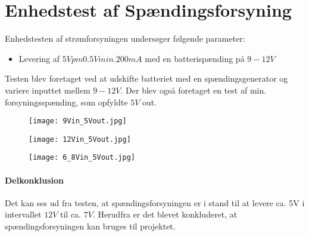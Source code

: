 %
%

\chapter{Enhedstest af Spændingsforsyning}
\label{appendix:Bilag_enhedstest_spaendingsforsyning}
Enhedstesten af strømforsyningen undersøger følgende parameter: 

\begin{itemize}

\item Levering af $5V pm 0.5V min. 200mA $ med en batterispænding på $9-12V$

\end{itemize}

Testen blev foretaget ved at udskifte batteriet med en spændingsgenerator og variere inputtet mellem $9-12V$. Der blev også foretaget en test af min. forsyningsspænding, som opfyldte $ 5V $ out. 

\begin{figure} [H]
	\centering
	\texttt{[image: 9Vin\_5Vout.jpg]}
	\label{fig:9Vin_5Vout}
\end{figure}
\begin{figure} [H]
	\centering
	\texttt{[image: 12Vin\_5Vout.jpg]}
	\label{fig:12Vin_5Vout}
\end{figure}
\begin{figure} [H]
	\centering
	\texttt{[image: 6\_8Vin\_5Vout.jpg]}
	\label{fig:6_8Vin_5Vout}
\end{figure}



\subsubsection{Delkonklusion}
Det kan ses ud fra testen, at spændingsforsyningen er i stand til at levere ca. 5V i intervallet $12 V$ til ca. $7 V$. Herudfra er det blevet konkluderet, at spændingsforsyningen kan bruges til projektet.


%